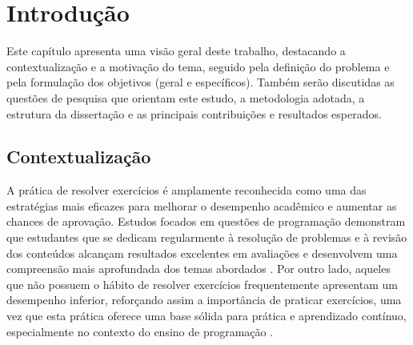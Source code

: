 \chapter{Introdução}\label{cap:modelo}

Este capítulo apresenta uma visão geral deste trabalho, destacando a contextualização e a motivação do tema, seguido pela definição do problema e pela formulação dos objetivos (geral e específicos). Também serão discutidas as questões de pesquisa que orientam este estudo, a metodologia adotada, a estrutura da dissertação e as principais contribuições e resultados esperados. 

\section{Contextualização}

A prática de resolver exercícios é amplamente reconhecida como uma das estratégias mais eficazes para melhorar o desempenho acadêmico e aumentar as chances de aprovação. Estudos focados em questões de programação demonstram que estudantes que se dedicam regularmente à resolução de problemas e à revisão dos conteúdos alcançam resultados excelentes em avaliações e desenvolvem uma compreensão mais aprofundada dos temas abordados \parencite{Ahadi2016}. Por outro lado,  aqueles que não possuem o hábito de resolver exercícios frequentemente apresentam um desempenho inferior, reforçando assim a importância de praticar exercícios, uma vez que esta prática oferece uma base sólida para prática e aprendizado contínuo,  especialmente no contexto do ensino de programação \parencite{Edwards2019}.  

